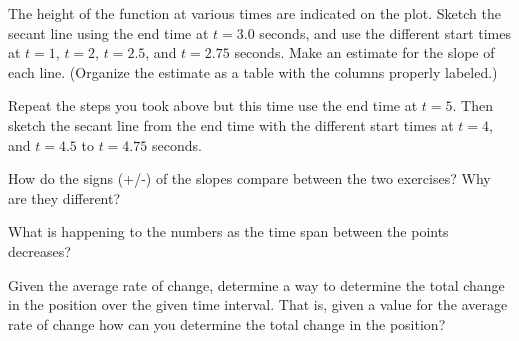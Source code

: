 \begin{problem}
    \begin{subproblem}
    \item The height of the function at various times are indicated on
      the plot. Sketch the secant line using the end time at $t=3.0$
      seconds, and use the different start times at $t=1$, $t=2$,
      $t=2.5$, and $t=2.75$ seconds. Make an estimate for the slope of
      each line. (Organize the estimate as a table with the columns
      properly labeled.)

      \vfill
      \clearpage

    \item Repeat the steps you took above but this time use the end
      time at $t=5$. Then sketch the secant line from the end time
      with the different start times at $t=4$, and $t=4.5$ to $t=4.75$
      seconds.

      \scalebox{0.5}{}

      \vfill

      \clearpage

    \item How do the signs (+/-) of the slopes compare between the
      two exercises? Why are they different?

      \vfill

    \item What is happening to the numbers as the time span between
      the points decreases?

      \vfill

    \item Given the average rate of change, determine a way to
      determine the total change in the position over the given time
      interval. That is, given a value for the average rate of change
      how can you determine the total change in the position?

      \vfill

    \end{subproblem}

\end{problem}


\postClass

